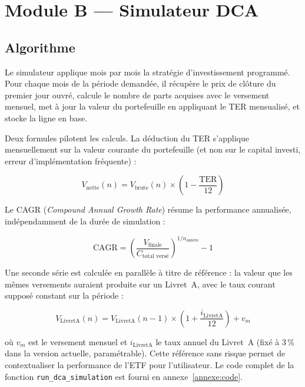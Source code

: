 \documentclass[11pt,a4paper]{article}
\begin{document}
\section{Module B --- Simulateur DCA}
\label{sec:dca}

\subsection{Algorithme}

Le simulateur applique mois par mois la stratégie d'investissement
programmé. Pour chaque mois de la période demandée, il récupère le
prix de clôture du premier jour ouvré, calcule le nombre de parts
acquises avec le versement mensuel, met à jour la valeur du
portefeuille en appliquant le TER mensualisé, et stocke la ligne en
base.

Deux formules pilotent les calculs. La déduction du TER s'applique
mensuellement sur la valeur courante du portefeuille (et non sur le
capital investi, erreur d'implémentation fréquente) :

\begin{equation}
V_{\text{nette}}(n) = V_{\text{brute}}(n) \times \left(1 - \frac{\text{TER}}{12}\right)
\end{equation}

Le CAGR (\textit{Compound Annual Growth Rate}) résume la performance
annualisée, indépendamment de la durée de simulation :

\begin{equation}
\text{CAGR} = \left(\frac{V_{\text{finale}}}{C_{\text{total versé}}}\right)^{1/n_{\text{années}}} - 1
\end{equation}

Une seconde série est calculée en parallèle à titre de référence : la
valeur que les mêmes versements auraient produite sur un Livret~A,
avec le taux courant supposé constant sur la période :

\begin{equation}
V_{\text{LivretA}}(n) = V_{\text{LivretA}}(n-1) \times \left(1 + \frac{i_{\text{LivretA}}}{12}\right) + v_m
\end{equation}

où $v_m$ est le versement mensuel et $i_{\text{LivretA}}$ le taux annuel
du Livret~A (fixé à 3\,\% dans la version actuelle, paramétrable). Cette
référence sans risque permet de contextualiser la performance de l'ETF
pour l'utilisateur. Le code complet de la fonction
\texttt{run\_dca\_simulation} est fourni en annexe~\ref{annexe:code}.
\end{document}
